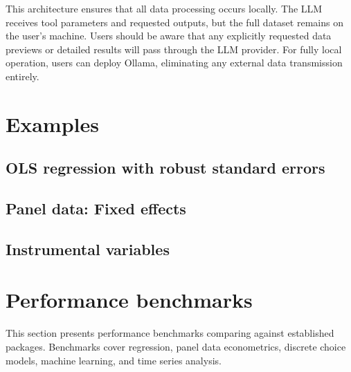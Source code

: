 This architecture ensures that all data processing occurs locally.
The LLM receives tool parameters and requested outputs, but the full dataset
remains on the user's machine. Users should be aware that any explicitly
requested data previews or detailed results will pass through the LLM provider.
For fully local operation, users can deploy Ollama, eliminating any external
data transmission entirely.



\section{Examples} \label{sec:examples}


\subsection{OLS regression with robust standard errors}


\subsection{Panel data: Fixed effects}


\subsection{Instrumental variables}




\section{Performance benchmarks} \label{sec:performance}

This section presents performance benchmarks comparing 
against established  packages. Benchmarks cover regression,
panel data econometrics, discrete choice models, machine learning, and time
series analysis.

